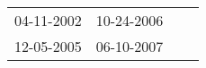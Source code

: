 \begin{supertabular}{llll}
 04-11-2002 &  10-24-2006 \\
 12-05-2005 &  06-10-2007 \\
\end{supertabular}

